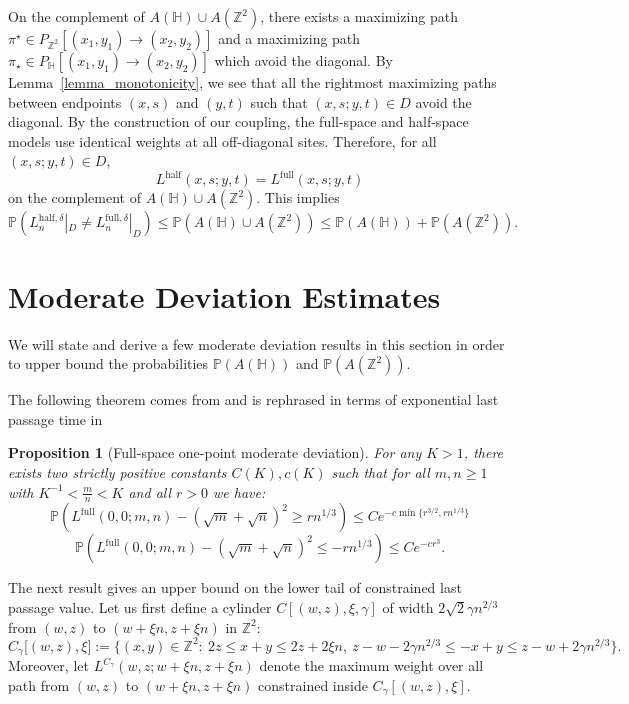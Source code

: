 \documentclass[11pt]{article}
\newtheorem{proposition}[theorem]{Proposition}
\theoremstyle{definition}
\newcommand{\Z}{\mathbb{Z}}
\newcommand{\HH}{\mathbb{H}}
\newcommand{\Prob}{\mathbb{P}}
\newcommand{\Lfull}{L^{\mathrm{full}}}
\begin{document}
On the complement of $A(\HH)\cup A(\Z^2)$, there exists a maximizing path
$\pi^\star \in P_{\Z^2}[(x_1,y_1)\to(x_2,y_2)]$ and a maximizing path $\pi_\star \in P_{\HH}[(x_1,y_1)\to(x_2,y_2)]$ which avoid the diagonal. By Lemma~\ref{lemma_monotonicity}, we see that all the rightmost maximizing paths between endpoints $(x,s)$ and $(y,t)$ such that $(x,s;y,t) \in D$ avoid the diagonal. By the construction of our coupling, the full-space and half-space models
use identical weights at all off-diagonal sites. Therefore, for all $(x,s;y,t) \in D$,
\[
L^{\mathrm{half}}(x,s;y,t)
= L^{\mathrm{full}}(x,s;y,t)
\]
 on the complement of $A(\HH)\cup A(\Z^2)$. This implies
\[
\Prob\!\left(L^{\mathrm{half},\delta}_n|_D \neq L^{\mathrm{full},\delta}_n|_D\right)
\le \Prob\!\left(A(\HH)\cup A(\Z^2)\right) \leq \Prob(A(\HH)) + \Prob(A(\Z^2)).
\]

\section{Moderate Deviation Estimates}
\label{sec:full_moderate}
We will state and derive a few moderate deviation results in this section in order to upper bound the probabilities $\Prob(A(\HH))$ and $\Prob(A(\Z^2))$.

The following theorem comes from \cite[Theorem 2]{Small_Deviation} and is rephrased in terms of exponential last passage time in \cite[Theorem 2.2]{Nonexistence}

\begin{proposition}[Full-space one-point moderate deviation]
\label{prop:moderate}
For any $K > 1$, there exists two strictly positive constants $C(K), c(K)$ such that for all $m,n \geq 1$ with $K^{-1} < \frac{m}{n} < K$ and all $r > 0$ we have:
\begin{equation}
    \Prob\left(\Lfull(0,0;m,n) - (\sqrt{m} + \sqrt{n})^2 \geq rn^{1/3}\right) \leq Ce^{-c \min\{r^{3/2},rn^{1/3}\}}
\end{equation}
\begin{equation}
    \Prob\left(\Lfull(0,0;m,n) - (\sqrt{m} + \sqrt{n})^2 \leq -rn^{1/3}\right) \leq Ce^{-c r^3}.
\end{equation}
\end{proposition}

The next result gives an upper bound on the lower tail of constrained last passage value. Let us first define a cylinder $C\left[(w,z), \xi,\gamma\right]$ of width $2\sqrt{2}\gamma n^{2/3}$ from $(w,z)$ to $(w+\xi n, z+\xi n)$ in $\Z^2$:
\begin{equation}\label{eq:cylinder_def}
C_{\gamma}\big[(w,z),\xi\big]
:=\Big\{(x,y)\in\Z^2:
\ 2z \le x+y \le 2z+2\xi n,\ 
z-w-2\gamma n^{2/3} \le -x+y \le z-w+2\gamma n^{2/3}
\Big\}.
\end{equation}
Moreover, let $L^{C_\gamma}(w,z;w+\xi n, z+ \xi n)$ denote the maximum weight over all path from $(w,z)$ to $(w+\xi n, z+ \xi n)$ constrained inside $C_\gamma\left[(w,z), \xi\right]$. 
\end{document}
